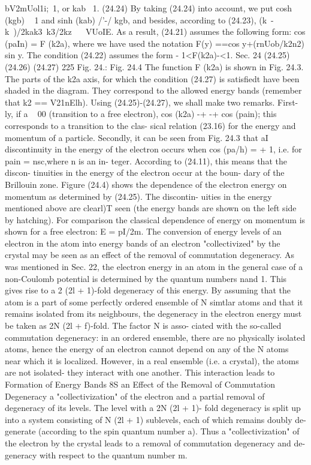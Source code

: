 \documentclass[a4paper,sfsidenotes,colorlinks=true]{tufte-book}
\numberwithin{equation}{section}
\numberwithin{figure}{section}
\begin{document}
{{{{{bV2mUol1i;~1, or kab~ 1.	(24.24) By taking (24.24) into account, we put cosh (kgb) ~ 1
and sinh (kab) /'-/ kgb, and besides, according to (24.23), (k~-k~)/2kak3~k3/2kz ~ ~VUoIE.
As a result, (24.21) assumes the following form: cos (paIn) = F (k2a),
where we have used the notation F(y) ==cos y+(rnUob/k2n2) sin y. The condition (24.22) assumes the form - 1<F(k2a)-<1.
Sec. 24
(24.25)
(24.26) (24.27)
225
Fig. 24.:
Fig. 24.4
The function F (k2a) is shown in Fig. 24.3. The parts of the k2a axis, for which the condition (24.27) is satisfiedt have been shaded in the diagram. They correspond to the
allowed energy bands (remember that k2 == V21nElh).
Using (24.25)-(24.27), we shall make two remarks. First- ly, if a ~ 00 (transition to a free electron), cos (k2a) -+ -+ cos (pain); this corresponds to a transition to the clas- sical relation (23.16) for the energy and momentum of a particle. Secondly, it can be seen from Fig. 24.3 that aI
discontinuity in the energy of the electron occurs when cos (pa/h) = + 1, i.e. for pain = nsc,where n is an in- teger. According to (24.11), this means that the discon- tinuities in the energy of the electron occur at the boun- dary of the Brillouin zone.
Figure (24.4) shows the dependence of the electron energy on momentum as determined by (24.25). The discontin- uities in the energy mentioned above are clearl)T seen (the energy bands are shown on the left side by hatching). For comparison the classical dependence of energy on
momentum is shown for a free electron: E = pI/2m. The conversion of energy levels of an electron in the atom into energy bands of an electron "collectivized" by the crystal may be seen as an effect of the removal of
commutation degeneracy. As was mentioned in Sec. 22, the electron energy in an atom in the general case of a non-Coulomb potential is determined by the quantum numbers nand 1. This gives rise to a 2 (2l + 1)-fold degeneracy of this energy. By assuming that the atom is a part of some perfectly ordered ensemble of N simtlar atoms and that it remains isolated from its neighbours, the degeneracy in the electron energy must be taken as 2N (2l + f)-fold. The factor N is asso- ciated with the so-called commutation degeneracy: in an ordered ensemble, there are no physically isolated atoms, hence the energy of an electron cannot depend on any of the N atoms near which it is localized. However, in a real ensemble (i.e. a crystal), the atoms are not isolated- they interact with one another. This interaction leads to
Formation of Energy Bands 8S an Effect of the Removal of Commutation Degeneracy
a "collectivization" of the electron and a partial removal of degeneracy of its levels. The level with a 2N (2l + 1)- fold degeneracy is split up into a system consisting of N (2l + 1) sublevels, each of which remains doubly de- generate (according to the spin quantum number a). Thus a "collectivization" of the electron by the crystal leads to a removal of commutation degeneracy and de- generacy with respect to the quantum number m.
}}}}}
\end{document}
